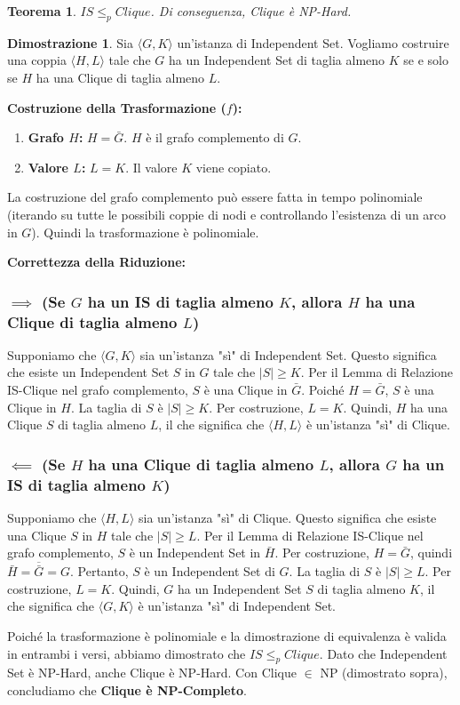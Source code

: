 \documentclass[a4paper]{article}
\newtheorem{theorem}{Teorema}[section]
\theoremstyle{definition} %
\newtheorem*{proof*}{Dimostrazione}
\begin{document}
\begin{theorem}
$IS \le_p Clique$. Di conseguenza, \emph{Clique} è NP-Hard.
\end{theorem}

\begin{proof*}
Sia $\langle G, K \rangle$ un'istanza di Independent Set. Vogliamo costruire una coppia $\langle H, L \rangle$ tale che $G$ ha un Independent Set di taglia almeno $K$ se e solo se $H$ ha una Clique di taglia almeno $L$.

\textbf{Costruzione della Trasformazione ($f$):}
\begin{enumerate}
    \item \textbf{Grafo $H$:} $H = \bar{G}$. $H$ è il grafo complemento di $G$.
    \item \textbf{Valore $L$:} $L = K$. Il valore $K$ viene copiato.
\end{enumerate}
La costruzione del grafo complemento può essere fatta in tempo polinomiale (iterando su tutte le possibili coppie di nodi e controllando l'esistenza di un arco in $G$). Quindi la trasformazione è polinomiale.

\textbf{Correttezza della Riduzione:}

\subsubsection{$\implies$ (Se $G$ ha un IS di taglia almeno $K$, allora $H$ ha una Clique di taglia almeno $L$)}
Supponiamo che $\langle G, K \rangle$ sia un'istanza "sì" di Independent Set. Questo significa che esiste un Independent Set $S$ in $G$ tale che $|S| \ge K$.
Per il Lemma di Relazione IS-Clique nel grafo complemento, $S$ è una Clique in $\bar{G}$.
Poiché $H=\bar{G}$, $S$ è una Clique in $H$.
La taglia di $S$ è $|S| \ge K$. Per costruzione, $L=K$.
Quindi, $H$ ha una Clique $S$ di taglia almeno $L$, il che significa che $\langle H, L \rangle$ è un'istanza "sì" di Clique.

\subsubsection{$\impliedby$ (Se $H$ ha una Clique di taglia almeno $L$, allora $G$ ha un IS di taglia almeno $K$)}
Supponiamo che $\langle H, L \rangle$ sia un'istanza "sì" di Clique. Questo significa che esiste una Clique $S$ in $H$ tale che $|S| \ge L$.
Per il Lemma di Relazione IS-Clique nel grafo complemento, $S$ è un Independent Set in $\bar{H}$.
Per costruzione, $H=\bar{G}$, quindi $\bar{H} = \overline{\bar{G}} = G$.
Pertanto, $S$ è un Independent Set di $G$.
La taglia di $S$ è $|S| \ge L$. Per costruzione, $L=K$.
Quindi, $G$ ha un Independent Set $S$ di taglia almeno $K$, il che significa che $\langle G, K \rangle$ è un'istanza "sì" di Independent Set.

Poiché la trasformazione è polinomiale e la dimostrazione di equivalenza è valida in entrambi i versi, abbiamo dimostrato che $IS \le_p Clique$. Dato che Independent Set è NP-Hard, anche Clique è NP-Hard. Con Clique $\in$ NP (dimostrato sopra), concludiamo che \textbf{Clique è NP-Completo}.
\end{proof*}
\end{document}
